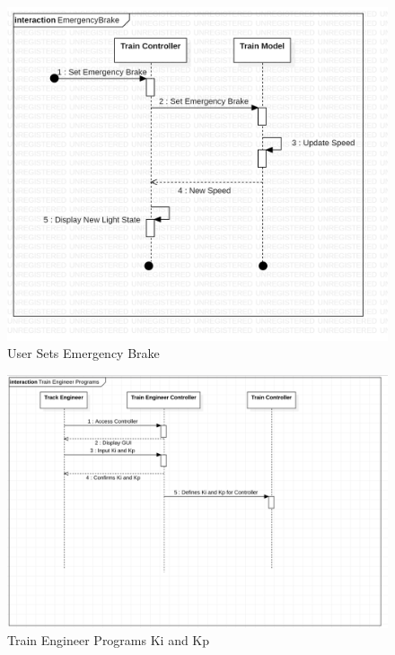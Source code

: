 \documentclass{article}
\begin{document}
    \begin{figure}[H]
        \centering
        \includegraphics[width=\textwidth]{./System/Sequence/EBrake.png}
        \caption{User Sets Emergency Brake}
        \label{fig:system_ebrake_seq}
    \end{figure}
    
    \begin{figure}[H]
        \centering
        \includegraphics[width=\textwidth]{./TNCSD/TrainEngineerPrograms.png}
        \caption{Train Engineer Programs Ki and Kp}
        \label{fig:Train Engineer Programs Ki and Kp}
    \end{figure}
    
\end{document}
